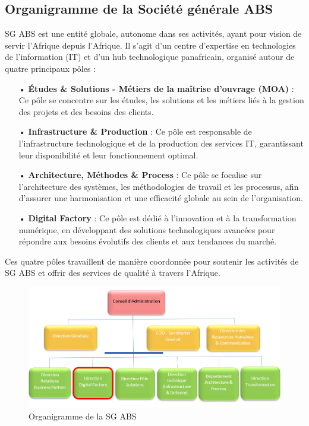 \newpage

\subsection{Organigramme de la Société générale ABS}
SG ABS est une entité globale, autonome dans ses activités, ayant pour vision de servir l’Afrique depuis l’Afrique. Il s'agit d'un centre d'expertise en technologies de l'information (IT) et d'un hub technologique panafricain, organisé autour de quatre principaux pôles :

\begin{itemize}
    \item[•] \textbf{Études \& Solutions - Métiers de la maîtrise d'ouvrage (MOA)} : Ce pôle se concentre sur les études, les solutions et les métiers liés à la gestion des projets et des besoins des clients.
    \item[•] \textbf{Infrastructure \& Production} : Ce pôle est responsable de l'infrastructure technologique et de la production des services IT, garantissant leur disponibilité et leur fonctionnement optimal.
    \item[•] \textbf{Architecture, Méthodes \& Process} : Ce pôle se focalise sur l'architecture des systèmes, les méthodologies de travail et les processus, afin d'assurer une harmonisation et une efficacité globale au sein de l'organisation.
    \item[•] \textbf{Digital Factory} : Ce pôle est dédié à l'innovation et à la transformation numérique, en développant des solutions technologiques avancées pour répondre aux besoins évolutifs des clients et aux tendances du marché.
\end{itemize}

Ces quatre pôles travaillent de manière coordonnée pour soutenir les activités de SG ABS et offrir des services de qualité à travers l'Afrique.

\begin{figure}[!h]
    \centering
        \includegraphics[width=15cm]{images/contexte/ogranigramme2.png}
        \caption{Organigramme de la SG ABS}
\end{figure}
\medskip

